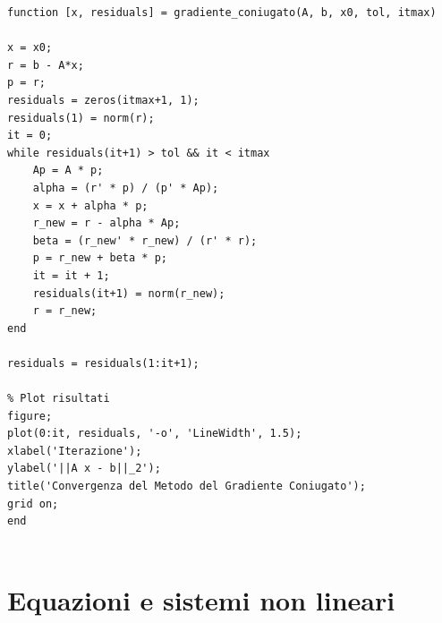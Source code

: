 \documentclass[12pt,a4paper]{article}
\begin{document}
\begin{flushleft}
\end{flushleft}

\vspace{1em}
\begin{lstlisting}
function [x, residuals] = gradiente_coniugato(A, b, x0, tol, itmax)

x = x0;
r = b - A*x;
p = r;
residuals = zeros(itmax+1, 1);
residuals(1) = norm(r);
it = 0;
while residuals(it+1) > tol && it < itmax
    Ap = A * p;
    alpha = (r' * p) / (p' * Ap);
    x = x + alpha * p;
    r_new = r - alpha * Ap;
    beta = (r_new' * r_new) / (r' * r);
    p = r_new + beta * p;
    it = it + 1;
    residuals(it+1) = norm(r_new);
    r = r_new;
end

residuals = residuals(1:it+1);

% Plot risultati
figure;
plot(0:it, residuals, '-o', 'LineWidth', 1.5);
xlabel('Iterazione');
ylabel('||A x - b||_2');
title('Convergenza del Metodo del Gradiente Coniugato');
grid on;
end


\end{lstlisting}
\section*{Equazioni e sistemi non lineari}
\end{document}
